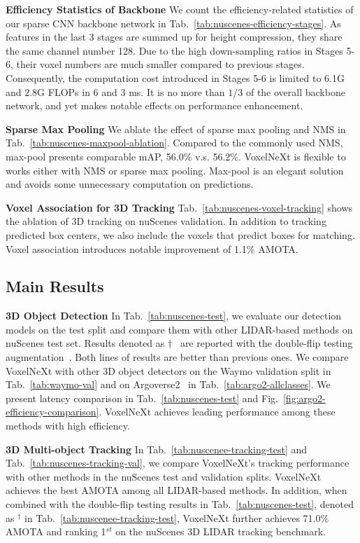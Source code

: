 \documentclass[10pt,twocolumn,letterpaper]{article}
\begin{document}
\vspace{0.5em}
\noindent
\textbf{Efficiency Statistics of Backbone}
We count the efficiency-related statistics of our sparse CNN backbone network in Tab.~\ref{tab:nuscenes-efficiency-stages}. As features in the last 3 stages are summed up for height compression, they share the same channel number 128. Due to the high down-sampling ratios in Stages 5-6, their voxel numbers are much smaller compared to previous stages. Consequently, the computation cost introduced in Stages 5-6 is limited to 6.1G and 2.8G FLOPs in 6 and 3 ms. It is no more than $1/3$ of the overall backbone network, and yet makes notable effects on performance enhancement.

\vspace{0.5em}
\noindent
\textbf{Sparse Max Pooling}
We ablate the effect of sparse max pooling and NMS in Tab.~\ref{tab:nuscenes-maxpool-ablation}. Compared to the commonly used NMS, max-pool presents comparable mAP, 56.0\% v.s. 56.2\%. VoxelNeXt is flexible to works either with NMS or sparse max pooling. Max-pool is an elegant solution and avoids some unnecessary computation on predictions.

\vspace{0.5em}
\noindent
\textbf{Voxel Association for 3D Tracking}
Tab.~\ref{tab:nuscenes-voxel-tracking} shows the ablation of 3D tracking on nuScenes validation. In addition to tracking predicted box centers, we also include the voxels that predict boxes for matching. Voxel association introduces notable improvement of 1.1\% AMOTA. 

\subsection{Main Results}
\noindent
\textbf{3D Object Detection}
In Tab.~\ref{tab:nuscenes-test}, we evaluate our detection models on the test split and compare them with other LIDAR-based methods on nuScenes test set.
Results denoted as $\dagger$~\cite{vista, uvtr, pillarnet} are reported with the double-flip testing augmentation~\cite{centerpoint}. Both lines of results are better than previous ones. We compare VoxelNeXt with other 3D object detectors on the Waymo validation split in Tab.~\ref{tab:waymo-val} and on Argoverse2~\cite{argo2} in Tab.~\ref{tab:argo2-allclasses}. We present latency comparison in Tab.~\ref{tab:nuscenes-test} and Fig.~\ref{fig:argo2-efficiency-comparison}.
VoxelNeXt achieves leading performance among these methods with high efficiency. 

\vspace{0.1em}
\noindent
\textbf{3D Multi-object Tracking}
In Tab.~\ref{tab:nuscenee-tracking-test} and Tab.~\ref{tab:nuscenes-tracking-val}, we compare VoxelNeXt's tracking performance with other methods in the nuScenes test and validation splits. VoxelNeXt achieves the best AMOTA among all LIDAR-based methods. In addition, when combined with the double-flip testing results in Tab.~\ref{tab:nuscenes-test}, denoted as $^{\dagger}$ in Tab.~\ref{tab:nuscenee-tracking-test}, VoxelNeXt further achieves 71.0\% AMOTA and ranking 1$^{st}$ on the nuScenes 3D LIDAR tracking benchmark.
\end{document}
